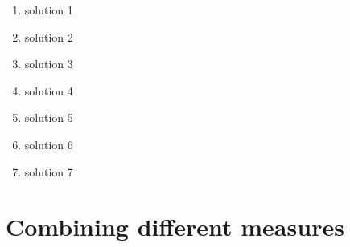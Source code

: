  \begin{solutions}{}{
\begin{enumerate}[itemsep=5pt, label=\textbf{\arabic*}. ] 


\item solution 1
\item solution 2
\item solution 3
\item solution 4
\item solution 5
\item solution 6
\item solution 7

\end{enumerate}}
\end{solutions}


\section{Combining different measures}
